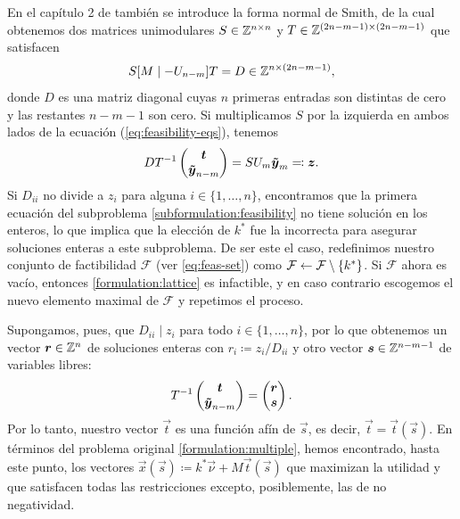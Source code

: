 En el capítulo 2 de \cite{morris} también se introduce la forma normal de Smith, de la cual
obtenemos dos matrices unimodulares $S \in \mathbb{Z}^{n \times n}$ y $T \in \mathbb{Z}^{(2n - m - 1) \times (2n - m
-1)}$ que satisfacen
\begin{equation*}
	S[M \mid -U_{n-m}]T = D \in \mathbb{Z}^{n \times (2n - m - 1)},
\end{equation*}
donde $D$ es una matriz diagonal cuyas $n$ primeras entradas son distintas de cero y las restantes
$n - m - 1$ son cero. Si multiplicamos $S$ por la izquierda en ambos lados de la ecuación
(\ref{eq:feasibility-eqs}), tenemos
\begin{equation}
	\label{eq:sum}
	DT^{-1}\begin{pmatrix} \boldsymbol{t} \\ \boldsymbol{\tilde{y}}_{n-m} \end{pmatrix}
	= SU_m\boldsymbol{\tilde{y}}_{m} \eqcolon \boldsymbol{z}.
\end{equation}
Si $D_{ii}$ no divide a $z_i$ para alguna $i \in \lbrace 1, \ldots, n \rbrace$,
encontramos que la primera ecuación del subproblema \eqref{subformulation:feasibility} no tiene
solución en los enteros, lo que implica que la elección de $k^*$ fue la incorrecta para asegurar
soluciones enteras a este subproblema. De ser este el caso, redefinimos nuestro conjunto de
factibilidad $\mathcal{F}$ (ver \eqref{eq:feas-set}) como $\mathcal{F} \leftarrow \mathcal{F}
\setminus \lbrace k^* \rbrace$. Si $\mathcal{F}$ ahora es vacío, entonces \eqref{formulation:lattice} es
infactible, y en caso contrario escogemos el nuevo elemento maximal de $\mathcal{F}$ y repetimos el proceso.

Supongamos, pues, que $D_{ii} \mid z_i$ para todo $i \in \lbrace 1, \ldots, n\rbrace$, por lo que
obtenemos un vector $\boldsymbol{r} \in \mathbb{Z}^n$ de soluciones enteras con $r_i \coloneq z_i / D_{ii}$ y otro
vector $\boldsymbol{s} \in \mathbb{Z}^{n-m-1}$ de variables libres:
\begin{equation*}
	T^{-1}\begin{pmatrix} \boldsymbol{t} \\ \boldsymbol{\tilde{y}}_{n-m} \end{pmatrix}
	=
	\begin{pmatrix} \boldsymbol{r} \\ \boldsymbol{s} \end{pmatrix}.
\end{equation*}
Por lo tanto, nuestro vector $\vec{t}$ es una función afín de $\vec{s}$, es decir, $\vec{t} =
\vec{t}(\vec{s})$. En términos del problema original \eqref{formulation:multiple}, hemos encontrado,
hasta este punto, los vectores $\vec{x}(\vec{s}) \coloneq k^*\vec{\nu} + M\vec{t}(\vec{s})$ que
maximizan la utilidad y que satisfacen todas las restricciones excepto, posiblemente, las de no
negatividad.

